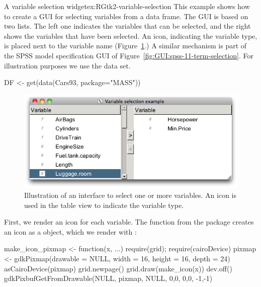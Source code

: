 \begin{example}{A variable selection widget}{ex:RGtk2-variable-selection}
This example shows how to create a GUI for selecting variables from a
data frame. The GUI is based on two lists. The left one indicates the
variables that can be selected, and the right shows the variables that
have been selected. An icon, indicating the variable type, is placed
next to the variable name (Figure~\ref{fig:RGtk2-select-variables}.) A
similar mechanism is part of the SPSS model specification GUI of
Figure~\ref{fig:GUI:spss-11-term-selection}. For illustration purposes
we use the  data set.
\begin{Schunk}
\begin{Sinput}
 DF <- get(data(Cars93, package="MASS"))
\end{Sinput}
\end{Schunk}


\begin{figure}
  \centering
  \includegraphics[width=.8\textwidth]{fig-RGtk2-select-variables}
  \caption{Illustration of an interface to select one or more
    variables. An icon is used in the table view to indicate the
    variable type.}
  \label{fig:RGtk2-select-variables}
\end{figure}

First, we render an icon for each variable.  The 
function from the  package creates an icon as a
 object, which we render with :
% 
\begin{Schunk}
\begin{Sinput}
 make_icon_pixmap <- function(x, ...) {
   require(grid); require(cairoDevice)
   pixmap <- gdkPixmap(drawable = NULL, width = 16, height = 16, 
                       depth = 24)
   asCairoDevice(pixmap)
   grid.newpage()
   grid.draw(make_icon(x))
   dev.off()
   gdkPixbufGetFromDrawable(NULL, pixmap, NULL, 0,0, 0,0, -1,-1)
 }
\end{Sinput}
\end{Schunk}


\end{example}
